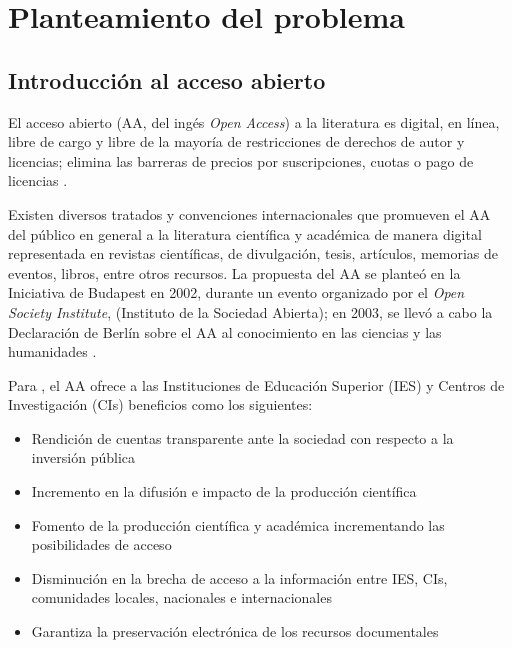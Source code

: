 \renewcommand{\chaptername}{Cap\'itulo}
\chapter{Planteamiento del problema} 

\section{Introducci\'on al acceso abierto}

El acceso abierto (AA, del ing\'es \emph{Open Access}) a la literatura es digital, en l\'inea, libre de cargo y libre de la mayor\'ia de restricciones de derechos de autor y licencias; elimina las barreras de precios por suscripciones, cuotas o pago de licencias \cite{PeterSuber2015}.\newline


Existen diversos tratados y convenciones internacionales que promueven el AA del p\'ublico en general a la literatura cient\'ifica y acad\'emica de manera digital representada en revistas cient\'ificas, de divulgaci\'on, tesis, art\'iculos, memorias de eventos, libros, entre otros recursos. La propuesta del AA se plante\'o en la Iniciativa de Budapest en 2002, durante un evento organizado por el \textit{Open Society Institute}, (Instituto de la Sociedad Abierta); en 2003, se llev\'o a cabo la Declaraci\'on de Berl\'in sobre el AA al conocimiento en las ciencias y las humanidades \cite{para2010abierto}.

Para \cite{BeneficiosAA}, el AA ofrece a las Instituciones de Edu\-caci\'on Superior (IES) y Centros de Investigaci\'on (CIs) beneficios como los siguientes: 
\begin{itemize}
\item Rendici\'on de cuentas transparente ante la sociedad con respecto a la inversi\'on p\'ublica
\item Incremento en la difusi\'on e impacto de la producci\'on cient\'ifica  
\item Fomento de la producci\'on cient\'ifica y acad\'emica incrementando las posibilidades de acceso 
\item Dis\-mi\-nu\-ci\'on en la brecha de acceso a la informaci\'on entre IES, CIs, comunidades locales, nacionales e internacionales
\item Garantiza la preservaci\'on electr\'onica de los recursos documentales
\end{itemize}
 

